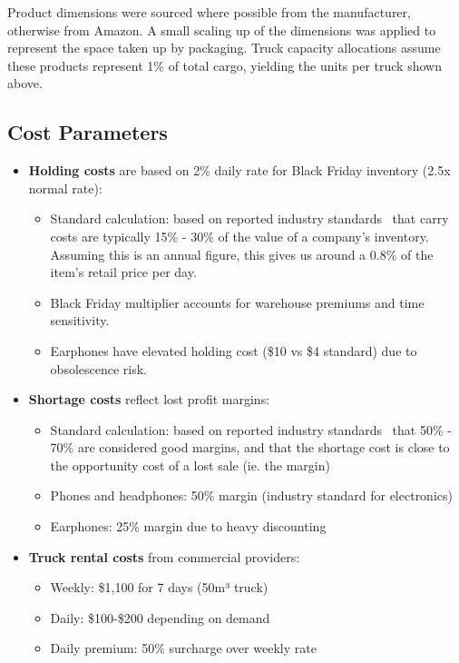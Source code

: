 \documentclass[a4paper,12pt]{article}
\begin{document}
Product dimensions were sourced where possible from the manufacturer, otherwise from Amazon.
A small scaling up of the dimensions was applied to represent the space taken up by packaging.
Truck capacity allocations assume these products represent 1\% of total cargo, yielding the units per truck shown above.

\subsection{Cost Parameters}\label{subsec:cost-parameters}

\begin{itemize}
    \item \textbf{Holding costs} are based on 2\% daily rate for Black Friday inventory (2.5x normal rate):
    \begin{itemize}
        \item Standard calculation: based on reported industry standards~\cite{holdingcosts} that carry costs are typically 15\% - 30\% of the value of a company's inventory.
        Assuming this is an annual figure, this gives us around a 0.8\% of the item's retail price per day.
        \item Black Friday multiplier accounts for warehouse premiums and time sensitivity.
        \item Earphones have elevated holding cost (\$10 vs \$4 standard) due to obsolescence risk.
    \end{itemize}

    \item \textbf{Shortage costs} reflect lost profit margins:
    \begin{itemize}
        \item Standard calculation: based on reported industry standards~\cite{shortagecosts} that 50\% - 70\% are considered good margins, and that the shortage cost is close to the opportunity cost of a lost sale (ie. the margin)
        \item Phones and headphones: 50\% margin (industry standard for electronics)
        \item Earphones: 25\% margin due to heavy discounting
    \end{itemize}

    \item \textbf{Truck rental costs} from commercial providers:
    \begin{itemize}
        \item Weekly: \$1,100 for 7 days (50m³ truck)~\cite{truckcosts1}~\cite{truckcosts2}
        \item Daily: \$100-\$200 depending on demand
        \item Daily premium: 50\% surcharge over weekly rate
    \end{itemize}
\end{itemize}
\end{document}
